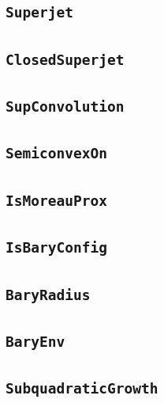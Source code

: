 \documentclass[11pt]{amsart}
\theoremstyle{definition}
\begin{document}
\subsection{\texorpdfstring{\texttt{Superjet}}{Superjet}}\label{node:Superjet}


\subsection{\texorpdfstring{\texttt{ClosedSuperjet}}{ClosedSuperjet}}\label{node:ClosedSuperjet}


\subsection{\texorpdfstring{\texttt{SupConvolution}}{SupConvolution}}\label{node:SupConvolution}


\subsection{\texorpdfstring{\texttt{SemiconvexOn}}{SemiconvexOn}}\label{node:SemiconvexOn}


\subsection{\texorpdfstring{\texttt{IsMoreauProx}}{IsMoreauProx}}\label{node:IsMoreauProx}


\subsection{\texorpdfstring{\texttt{IsBaryConfig}}{IsBaryConfig}}\label{node:IsBaryConfig}


\subsection{\texorpdfstring{\texttt{BaryRadius}}{BaryRadius}}\label{node:BaryRadius}


\subsection{\texorpdfstring{\texttt{BaryEnv}}{BaryEnv}}\label{node:BaryEnv}


\subsection{\texorpdfstring{\texttt{SubquadraticGrowth}}{SubquadraticGrowth}}\label{node:SubquadraticGrowth}

\end{document}

